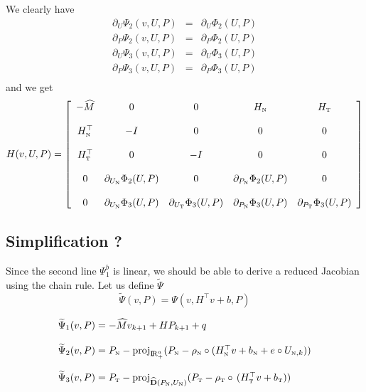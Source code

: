 We clearly have
\begin{equation}
  \label{eq:equivalentJacobian}
  \begin{array}{lcl}
     \partial_{U} \Psi_2(v,U,P) &=& \partial_{U} \Phi_2(U,P) \\ 
     \partial_{P} \Psi_2(v,U,P) &=& \partial_{P} \Phi_2(U,P) \\     
     \partial_{U} \Psi_3(v,U,P) &=& \partial_{U} \Phi_3(U,P) \\ 
     \partial_{P} \Psi_3(v,U,P) &=& \partial_{P} \Phi_3(U,P) \\
  \end{array}
\end{equation}
and we get
\begin{equation}
  \label{eq:GAC-L4}
   H(v,U,P) = 
   \left[\begin{array}{ccccc}
       - \widehat M & 0 & 0 & H_{{\hbox{\tiny{N}}}} & H_{{\hbox{\tiny{T}}}} \\ \\
        H_{{\hbox{\tiny{N}}}}^\top &  - I & 0 & 0 &0 \\ \\
        H_{{\hbox{\tiny{T}}}}^\top &  0  & -I & 0 &0 \\ \\
        0 & \partial_{U_{{\hbox{\tiny{N}}}}} \Phi_2(U,P) & 0 &   \partial_{P_{{\hbox{\tiny{N}}}}} \Phi_2(U,P) & 0 \\ \\
        0 & \partial_{U_{{\hbox{\tiny{N}}}}} \Phi_3(U,P) &  \partial_{U_{{\hbox{\tiny{T}}}}} \Phi_3(U,P) &  \partial_{P_{{\hbox{\tiny{N}}}}} \Phi_3(U,P)  & \partial_{P_{{\hbox{\tiny{T}}}}} \Phi_3(U,P)
   \end{array}\right]
\end{equation}


\subsection{Simplification ?}
Since the second line $\Psi_1^b$ is linear, we should be able to derive a reduced Jacobian using the chain rule. Let us define $\widetilde \Psi$
\begin{equation}
  \label{eq:chainrule}
  \widetilde \Psi(v,P)  = \Psi(v,H^\top v +b,P)
\end{equation}

\begin{equation}
  \label{eq:GAC-L5}
  \begin{array}{l}
  \widetilde \Psi_{1}(v,P) =  - \widehat M v_{k+1}  +  H P_{k+1}  + q \\ \\
  \widetilde \Psi_2(v,P) =  P_{{\hbox{\tiny{N}}}} - \operatorname{proj}_{\mathrm{I\!R}^{a}_+} (P_{{\hbox{\tiny{N}}}} - \rho_{{\hbox{\tiny{N}}}}\circ (H^\top_{{\hbox{\tiny{N}}}}v+b_{{\hbox{\tiny{N}}}} +e \circ  U_{{\hbox{\tiny{N}}},k}) ) \\ \\
  \widetilde \Psi_3(v,P) =  P_{{\hbox{\tiny{T}}}} - \operatorname{proj}_{\widehat {\bf D}(P_{{\hbox{\tiny{N}}}},U_{{\hbox{\tiny{N}}}})} (P_{{{\hbox{\tiny{T}}}}} - \rho_{{\hbox{\tiny{T}}}}\circ \,(H^\top_{\hbox{\tiny{T}}} v + b_{\hbox{\tiny{T}}}) )
\end{array}
\end{equation}

